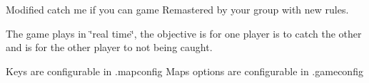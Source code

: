 Modified catch me if you can game Remastered by your group with new rules.

The game plays in \char`\"{}real time\char`\"{}, the objective is for one player is to catch the other and is for the other player to not being caught.

Keys are configurable in .mapconfig Maps options are configurable in .gameconfig 